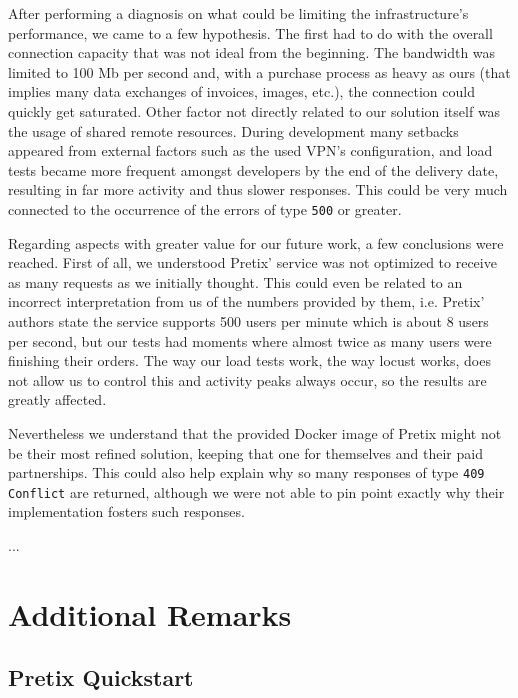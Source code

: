 \documentclass[12pt]{article}
\begin{document}
After performing a diagnosis on what could be limiting the infrastructure's performance, we came to a few hypothesis.
The first had to do with the overall connection capacity that was not ideal from the beginning.
The bandwidth was limited to 100 Mb per second and, with a purchase process as heavy as ours (that implies many data exchanges of invoices, images, etc.), the 
connection could quickly get saturated.
Other factor not directly related to our solution itself was the usage of shared remote resources.
During development many setbacks appeared from external factors such as the used VPN's configuration, and load tests became more frequent amongst developers by 
the end of the delivery date, resulting in far more activity and thus slower responses.
This could be very much connected to the occurrence of the errors of type \texttt{500} or greater.

Regarding aspects with greater value for our future work, a few conclusions were reached.
First of all, we understood Pretix' service was not optimized to receive as many requests as we initially thought.
This could even be related to an incorrect interpretation from us of the numbers provided by them, i.e. Pretix' authors state the service supports 500 users per 
minute which is about 8 users per second, but our tests had moments where almost twice as many users were finishing their orders.
The way our load tests work, the way locust works, does not allow us to control this and activity peaks always occur, so the results are greatly affected.

Nevertheless we understand that the provided Docker image of Pretix might not be their most refined solution, keeping that one for themselves and their paid 
partnerships.
This could also help explain why so many responses of type \texttt{409 Conflict} are returned, although we were not able to pin point exactly why their 
implementation fosters such responses.


...

\newpage
\section{Additional Remarks} \label{remarks} %

\subsection{Pretix Quickstart} \label{remarks.quickstart} %
\end{document}
